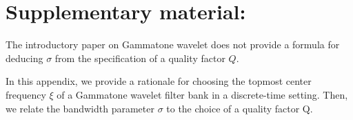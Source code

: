 \documentclass[smallextended]{svjour3}
\begin{document}
%









\section{Supplementary material: }

The introductory paper on Gammatone wavelet \cite{Venkitaraman2014} does not provide a formula for deducing $\sigma$ from the specification of a quality factor $Q$.

In this appendix, we provide a rationale for choosing the topmost center frequency $\xi$ of a Gammatone wavelet filter bank in a discrete-time setting. Then, we relate the bandwidth parameter $\sigma$ to the choice of a quality factor Q.
\end{document}
